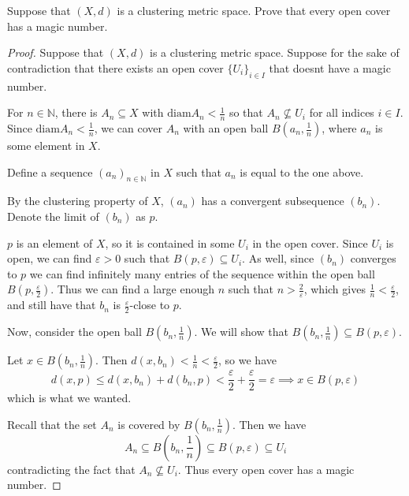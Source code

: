 \documentclass{article}
\newcommand{\diam}{\mathrm{diam}}
\theoremstyle{plain} %
\numberwithin{thm}{section} %
\theoremstyle{definition}
\begin{document}
        Suppose that $(X,d)$ is a clustering metric space. Prove that every open cover has a magic number.

        \begin{proof}
            Suppose that \((X,d)\) is a clustering metric space. Suppose for the sake of contradiction that there exists an open cover \(\{U_i\}_{i\in I}\) that doesnt have a magic number.

            For \(n \in \mathbb{N}\), there is \(A_n \subseteq X\) with \(\diam A_n < \frac{1}{n}\) so that \(A_n \nsubseteq U_i\) for all indices \(i \in I\). Since \(\diam A_n < \frac{1}{n}\), we can cover \(A_n\) with an open ball \(B(a_n, \frac{1}{n})\), where \(a_n\) is some element in \(X\).

            Define a sequence \((a_n)_{n\in \mathbb{N}}\) in \(X\) such that \(a_n\) is equal to the one above.

            By the clustering property of \(X\), \((a_n)\) has a convergent subsequence \((b_n)\). Denote the limit of \((b_n)\) as \(p\).

            \(p\) is an element of \(X\), so it is contained in some \(U_i\) in the open cover. Since \(U_i\) is open, we can find \(\varepsilon > 0\) such that \(B(p, \varepsilon) \subseteq U_i\). As well, since \((b_n)\) converges to \(p\) we can find infinitely many entries of the sequence within the open ball \(B(p, \frac{\varepsilon}{2})\). Thus we can find a large enough \(n\) such that \(n > \frac{2}{\varepsilon}\), which gives \(\frac{1}{n} < \frac{\varepsilon}{2}\), and still have that \(b_n\) is \(\frac{\varepsilon}{2}\)-close to \(p\).

            Now, consider the open ball \(B(b_n, \frac{1}{n})\). We will show that \(B(b_n, \frac{1}{n}) \subseteq B(p, \varepsilon)\).

            Let \(x \in B(b_n, \frac{1}{n})\). Then \(d(x, b_n) < \frac{1}{n} < \frac{\varepsilon}{2}\), so we have
            \[
                d(x,p) \leq d(x,b_n) + d(b_n,p) < \frac{\varepsilon}{2} + \frac{\varepsilon}{2} = \varepsilon \implies x \in B(p, \varepsilon)
            \]
            which is what we wanted.

            Recall that the set \(A_n\) is covered by \(B(b_n, \frac{1}{n})\). Then we have
            \[
                A_n \subseteq B(b_n, \frac{1}{n}) \subseteq B(p, \varepsilon) \subseteq U_i
            \]
            contradicting the fact that \(A_n \nsubseteq U_i\). Thus every open cover has a magic number.

        \end{proof}
\end{document}
